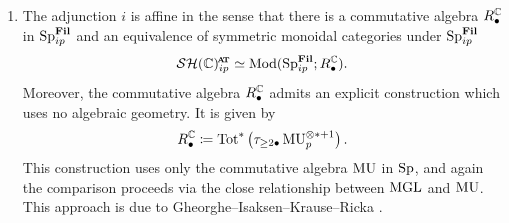 \begin{enumerate}
\item The adjunction $i$ is affine in the sense that there is a commutative algebra $R^{\mathbb{C}}_\bullet$ in $\operatorname{\mathrm{Sp}}_{ip}^{\operatorname{\mathbf{Fil}}}$ and an equivalence of symmetric monoidal categories under $\operatorname{\mathrm{Sp}}_{ip}^{\operatorname{\mathbf{Fil}}}$
  \[  \SHCat \simeq \Mod ( \Sp_{ip}^{\Fil} ; R^{\C}_\bullet ). \]
  Moreover, the commutative algebra $R^{\mathbb{C}}_\bullet$ admits an explicit construction which uses no algebraic geometry. It is given by
  \[ R_\bullet^{\mathbb{C}} \coloneqq \mathrm{Tot}^* \left( \tau_{\geq 2\bullet} \operatorname{\mathrm{MU}}_p^{\otimes * + 1} \right). \]
    This construction uses only the commutative algebra $\operatorname{\mathrm{MU}}$ in $\operatorname{\mathrm{Sp}}$, and again the comparison proceeds via the close relationship between $\mathrm{MGL}$ and $\operatorname{\mathrm{MU}}$. This approach is due to Gheorghe--Isaksen--Krause--Ricka \cite{cmmf}.
\end{enumerate}



